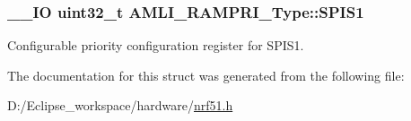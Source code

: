 \subsubsection[{S\+P\+I\+S1}]{\setlength{\rightskip}{0pt plus 5cm}\+\_\+\+\_\+\+I\+O uint32\+\_\+t A\+M\+L\+I\+\_\+\+R\+A\+M\+P\+R\+I\+\_\+\+Type\+::\+S\+P\+I\+S1}\label{struct_a_m_l_i___r_a_m_p_r_i___type_a92854848d086cfe7e1239e0cb30316e4}
Configurable priority configuration register for S\+P\+I\+S1. 

The documentation for this struct was generated from the following file\+:\begin{DoxyCompactItemize}
\item 
D\+:/\+Eclipse\+\_\+workspace/hardware/\hyperlink{nrf51_8h}{nrf51.\+h}\end{DoxyCompactItemize}
